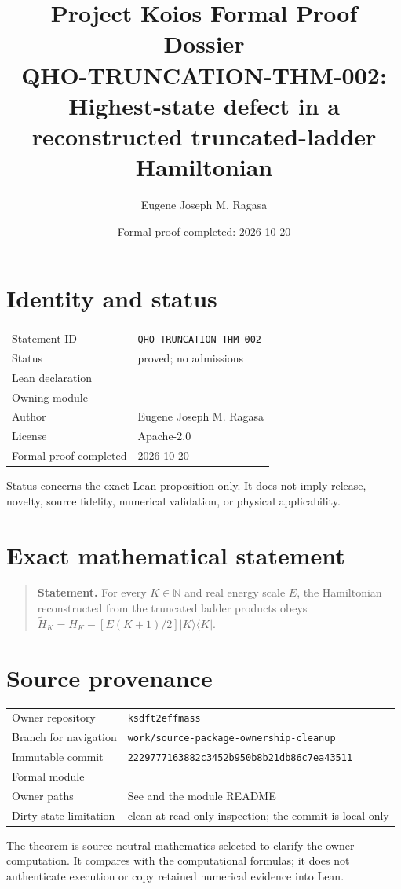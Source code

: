 \documentclass[11pt]{article}
\title{Project Koios Formal Proof Dossier\\\large QHO-TRUNCATION-THM-002: Highest-state defect in a reconstructed truncated-ladder Hamiltonian}
\author{Eugene Joseph M. Ragasa}
\date{Formal proof completed: 2026-10-20}
\begin{document}
\maketitle

\section{Identity and status}
\begin{tabularx}{\textwidth}{@{}lY@{}}\toprule
Statement ID & \texttt{QHO-TRUNCATION-THM-002} \\
Status & proved; no admissions \\
Lean declaration &  \\
Owning module &  \\
Author & Eugene Joseph M. Ragasa \\
License & Apache-2.0 \\
Formal proof completed & 2026-10-20 \\
\bottomrule\end{tabularx}
Status concerns the exact Lean proposition only. It does not imply release, novelty,
source fidelity, numerical validation, or physical applicability.

\section{Exact mathematical statement}
\begin{quote}\textbf{Statement.} For every $K\in\mathbb N$ and real energy scale $E$, the Hamiltonian reconstructed from the truncated ladder products obeys $\widetilde H_K=H_K-[E(K+1)/2]\lvert K\rangle\langle K\rvert$.\end{quote}

\section{Source provenance}
\begin{tabularx}{\textwidth}{@{}lY@{}}\toprule
Owner repository & \texttt{ksdft2effmass} \\
Branch for navigation & \texttt{work/source-package-ownership-cleanup} \\
Immutable commit & \texttt{2229777163882c3452b950b8b21db86c7ea43511} \\
Formal module &  \\
Owner paths & See  and the module README \\
Dirty-state limitation & clean at read-only inspection; the commit is local-only \\
\bottomrule\end{tabularx}
The theorem is source-neutral mathematics selected to clarify the owner computation. It
compares with the computational formulas; it does not authenticate execution or copy
retained numerical evidence into Lean.
\end{document}
